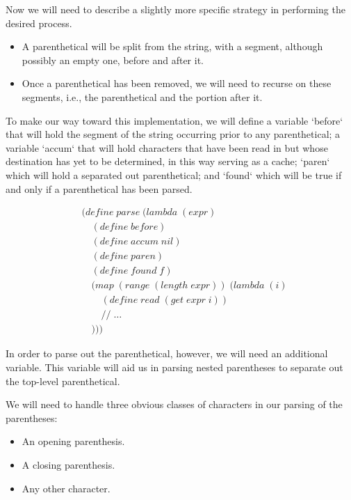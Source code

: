 Now we will need to describe a slightly more specific strategy in performing the desired 
process.

\begin{itemize}
  \item A parenthetical will be split from the string, with a segment, although possibly an empty one, before and after it.
  \item Once a parenthetical has been removed, we will need to recurse on these segments, i.e., the parenthetical and the portion after it.
\end{itemize}

To make our way toward this implementation, we will define a variable `before` that will 
hold the segment of the string occurring prior to any parenthetical; a variable `accum` 
that will hold characters that have been read in but whose destination has yet to be 
determined, in this way serving as a cache; `paren` which will hold a separated out 
parenthetical; and `found` which will be true if and only if a parenthetical has been 
parsed.

\begin{align*}
& (define \; parse \; (lambda \; (expr) \; 
\\& \quad (define \; before)
\\& \quad (define \; accum \; nil)
\\& \quad (define \; paren)
\\& \quad (define \; found \; f)
\\& \quad (map \; (range \; (length \; expr)) \; (lambda \; (i)
\\& \qquad (define \; read \; (get \; expr \; i))
\\& \qquad // \; \dots
\\& \quad )))
\end{align*}

In order to parse out the parenthetical, however, we will need an additional variable. 
This variable will aid us in parsing nested parentheses to separate out the top-level parenthetical.

We will need to handle three obvious classes of characters in our parsing of the parentheses:

\begin{itemize}
  \item An opening parenthesis.
  \item A closing parenthesis.
  \item Any other character.
\end{itemize}

